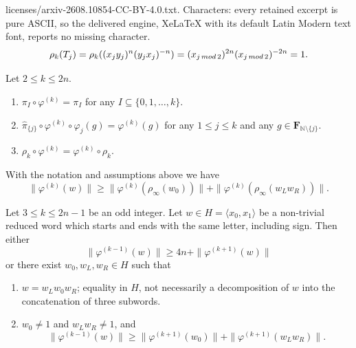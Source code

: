 \documentclass[10pt,a4paper]{amsart}
\newcommand{\B}[1]{{\mathbf #1}}
\begin{document}
licenses/arxiv-2608.10854-CC-BY-4.0.txt. Characters: every retained excerpt is pure ASCII, so the delivered engine, XeLaTeX with its default Latin Modern text font, reports no missing character.
\begin{equation}\label{eqn:phi_k(T_j)}
\rho_k(T_j) =
\rho_k((x_jy_j)^n (y_jx_j)^{-n}) =
(x_{j \, {\rm mod} \, 2})^{2n} (x_{j \, {\rm mod} \, 2})^{-2n} =1.
\end{equation}

\begin{lemma}\label{L:fi-pi}
Let $2\leq k\leq 2n$.
\begin{enumerate}[label=(\arabic*)]
\item \label{L:fi-pi:1}
$\pi_I\circ \varphi^{(k)}=\pi_I$ for any $I\subseteq\{0,1,\ldots,k\}$.
\item \label{L:fi-pi:2}
$\widehat{\pi}_{\{j\}}\circ\varphi^{(k)}\circ\varphi_j(g)=\varphi^{(k)}(g)$ for
any $1\leq j\leq k$ and any $g \in \B F_{\mathbb N\setminus\{j\}}$.
\item \label{L:fi-pi:3}
$\rho_k\circ\varphi^{(k)} = \varphi^{(k)}\circ \rho_k$.
\end{enumerate}
\end{lemma}

\begin{lemma}\label{L:fik-anti-triangle}
With the notation and assumptions above we have
$$
\|\varphi^{(k)}(w)\|\geq \|\varphi^{(k)}(\rho_{\infty}(w_0))\| + \|\varphi^{(k)}(\rho_{\infty}(w_Lw_R))\|.
$$
\end{lemma}

\begin{lemma}\label{L:intricate}
Let $3\leq k\leq 2n-1$ be an odd integer. Let $w\in H=\langle x_0,x_1\rangle$ be a non-trivial
reduced word which starts and ends with the same letter, including sign.
Then either
$$
\|\varphi^{(k-1)}(w)\|\geq 4n + \|\varphi^{(k+1)}(w)\|
$$
or there exist $w_0,w_L,w_R\in H$ such that 
\begin{enumerate}[label=(\alph*)]
\item $w=w_Lw_0w_R$; equality in $H$, not necessarily a decomposition of $w$ into the concatenation of three subwords. %

\item $w_0\neq 1$ and $w_Lw_R\neq 1$, and 
$$
\|\varphi^{(k-1)}(w)\|\geq  \|\varphi^{(k+1)}(w_0)\|+ \|\varphi^{(k+1)}(w_Lw_R)\|.
$$
\end{enumerate}
\end{lemma}
\end{document}
